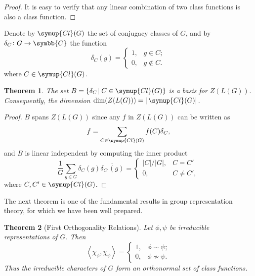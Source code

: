 \documentclass{assignment}[2019/10/15]
\newcommand{\lr}[3]{\left#1#3\right#2}
\theoremstyle{plain}
\newtheorem{theorem}{Theorem}[section]
\newcommand{\BC}{\symbb{C}}
\newcommand{\Cl}{\mathop{}\!\symup{Cl}}
\numberwithin{equation}{section}
\begin{document}
    \begin{proof}
        It is easy to verify that any linear combination of two class functions is also a class function.
    \end{proof}

    Denote by $\Cl(G)$ the set of conjugacy classes of $G$, and by $\delta_C\colon G\to\BC$ the function
    \begin{equation}
        \delta_C(g)=
        \begin{cases}
            1, &g\in C;\\
            0, &g\notin C.
        \end{cases}
    \end{equation}
    where $C\in \Cl(G)$.

    \begin{theorem}
        The set $B = \{\delta_C|\ C\in\Cl(G)\}$ is a basis for $Z(L(G))$. Consequently, the dimension $\dim(Z(L(G))) = |\Cl(G)|$.
    \end{theorem}

    \begin{proof}
        $B$ spans $Z(L(G))$ since any $f$ in $Z(L(G))$ can be written as
        \begin{equation}
            f = \sum_{C\in\Cl(G)}f(C)\delta_C,
        \end{equation}
        and $B$ is linear independent by computing the inner product
        \begin{equation}
            \frac{1}{G}\sum_{g\in G}\delta_C(g)\overline{\delta_{C'}(g)}=
            \begin{cases}
                |C|/|G|, &C=C'\\
                0, &C\neq C',
            \end{cases}
        \end{equation}
        where $C, C'\in \Cl(G)$.
    \end{proof}

    The next theorem is one of the fundamental results in group representation theory, for which we have been well prepared.

    \begin{theorem}[First Orthogonality Relations]
        Let $\phi, \psi$ be irreducible representations of $G$. Then
        \begin{equation}
            \lr<>{\chi_\phi, \chi_\psi}=
            \begin{cases}
                1, &\phi\sim\psi;\\
                0, &\phi\nsim\psi.
            \end{cases}
        \end{equation}
        Thus the irreducible characters of $G$ form an orthonormal set of class functions.
    \end{theorem}
\end{document}

